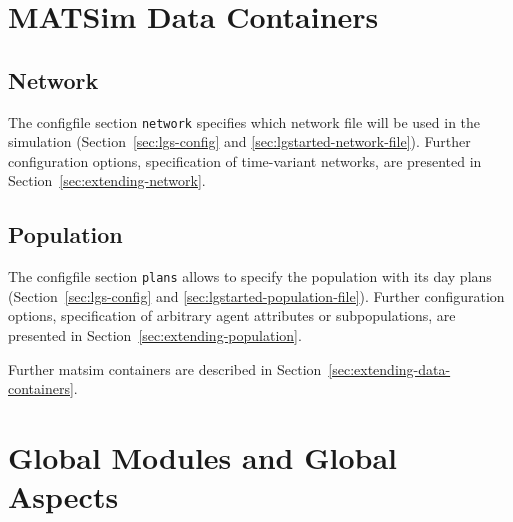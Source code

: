 \section{MATSim Data Containers}
\label{sec:using-data-containers}

\subsection{Network}
\label{sec:using-network}
The \gls{configfile} section \lstinline|network|
specifies which network file will be used in the simulation (Section~\ref{sec:lgs-config} and \ref{sec:lgstarted-network-file}). Further configuration options, \eg specification of time-variant networks, are presented in Section~\ref{sec:extending-network}.

\subsection{Population}
\label{sec:using-population}
The \gls{configfile} section \lstinline|plans| allows to specify the population with its day plans (Section~\ref{sec:lgs-config} and \ref{sec:lgstarted-population-file}). Further configuration options, \eg specification of arbitrary agent attributes or subpopulations, are presented in Section~\ref{sec:extending-population}.

Further \gls{matsim} containers are described in Section~\ref{sec:extending-data-containers}.

\section{Global Modules and Global Aspects}
\label{sec:using-globalmodules}
